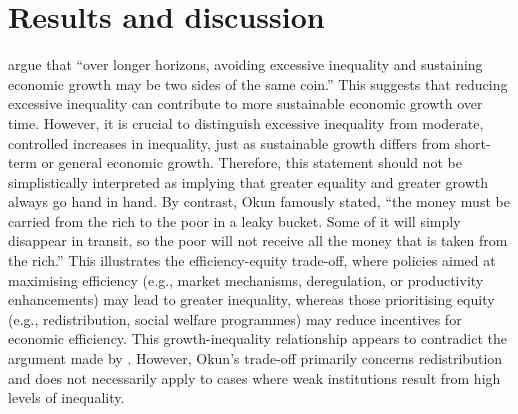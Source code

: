 \documentclass[12pt]{article}
\begin{document}
\section{Results and discussion}

\textcite{berg2017inequality} argue that ``over longer horizons, avoiding excessive inequality and sustaining economic growth may be two sides of the same coin.'' This suggests that reducing excessive inequality can contribute to more sustainable economic growth over time. However, it is crucial to distinguish excessive inequality from moderate, controlled increases in inequality, just as sustainable growth differs from short-term or general economic growth. Therefore, this statement should not be simplistically interpreted as implying that greater equality and greater growth always go hand in hand. By contrast, Okun \parencite*{okun2010equality} famously stated, ``the money must be carried from the rich to the poor in a leaky bucket. Some of it will simply disappear in transit, so the poor will not receive all the money that is taken from the rich.'' This illustrates the efficiency-equity trade-off, where policies aimed at maximising efficiency (e.g., market mechanisms, deregulation, or productivity enhancements) may lead to greater inequality, whereas those prioritising equity (e.g., redistribution, social welfare programmes) may reduce incentives for economic efficiency. This growth-inequality relationship appears to contradict the argument made by \textcite{berg2017inequality}. However, Okun's trade-off primarily concerns redistribution and does not necessarily apply to cases where weak institutions result from high levels of inequality.
\end{document}
